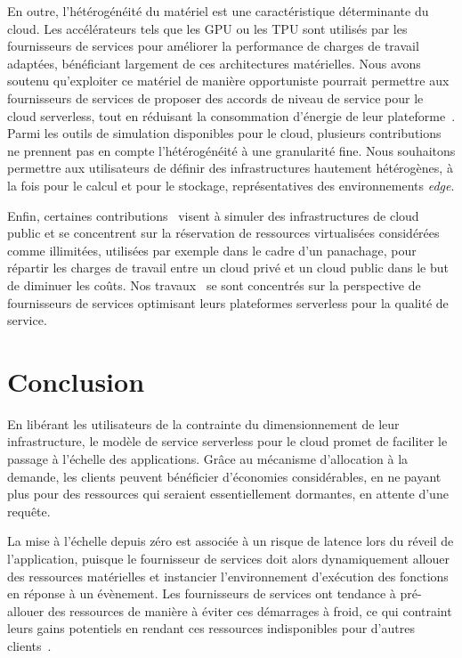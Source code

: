 En outre, l'hétérogénéité du matériel est une caractéristique déterminante du cloud. Les accélérateurs tels que les \gls{GPU} ou les \gls{TPU} sont utilisés par les fournisseurs de services pour améliorer la performance de charges de travail adaptées, bénéficiant largement de ces architectures matérielles. Nous avons soutenu qu'exploiter ce matériel de manière opportuniste pourrait permettre aux fournisseurs de services de proposer des accords de niveau de service pour le cloud serverless, tout en réduisant la consommation d'énergie de leur plateforme~\cite{herofake}.
Parmi les outils de simulation disponibles pour le cloud, plusieurs contributions~\cite{jeonCloudSimExtensionSimulatingDistributed2019, cai_elasticsim_2017, nunez_icancloud_2012, mahmoudiSimFaaSPerformanceSimulator2021} ne prennent pas en compte l'hétérogénéité à une granularité fine. Nous souhaitons permettre aux utilisateurs de définir des infrastructures hautement hétérogènes, à la fois pour le calcul et pour le stockage, représentatives des environnements \textit{edge}.

Enfin, certaines contributions~\cite{nunez_icancloud_2012, mahmoudiSimFaaSPerformanceSimulator2021} visent à simuler des infrastructures de cloud public et se concentrent sur la réservation de ressources virtualisées considérées comme illimitées, utilisées par exemple dans le cadre d'un panachage, pour répartir les charges de travail entre un cloud privé et un cloud public dans le but de diminuer les coûts.
Nos travaux~\cite{herofake, herocache} se sont concentrés sur la perspective de fournisseurs de services optimisant leurs plateformes serverless pour la qualité de service.

\section{Conclusion}

En libérant les utilisateurs de la contrainte du dimensionnement de leur infrastructure, le modèle de service serverless pour le cloud promet de faciliter le passage à l'échelle des applications. Grâce au mécanisme d'allocation à la demande, les clients peuvent bénéficier d'économies considérables, en ne payant plus pour des ressources qui seraient essentiellement dormantes, en attente d'une requête.


La mise à l'échelle depuis zéro est associée à un risque de latence lors du réveil de l'application, puisque le fournisseur de services doit alors dynamiquement allouer des ressources matérielles et instancier l'environnement d'exécution des fonctions en réponse à un évènement. Les fournisseurs de services ont tendance à pré-allouer des ressources de manière à éviter ces démarrages à froid, ce qui contraint leurs gains potentiels en rendant ces ressources indisponibles pour d'autres clients~\cite{tomasImprovingCloudInfrastructure2013}.

